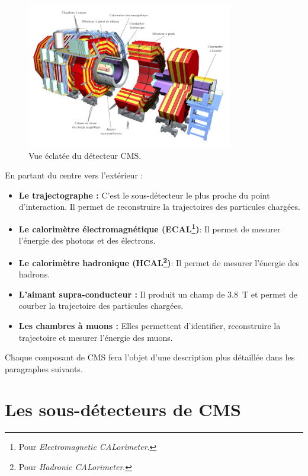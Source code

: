 \begin{figure}
	\centering
	\includegraphics[width=0.80\textwidth]{CMS/cms.png}
	\caption{\label{cmsexploded}Vue éclatée du détecteur CMS.}
\end{figure}
\newpage
En partant du centre vers l'extérieur :
\begin{itemize}[label=$\bullet$]
	\item \textbf{Le trajectographe : } C'est le sous-détecteur le plus proche du point d'interaction. Il permet de reconstruire la trajectoires des particules chargées.
	 \item \textbf{Le calorimètre électromagnétique (ECAL\footnote{Pour \textit{Electromagnetic CALorimeter}.})}: Il permet de mesurer l'énergie des photons et des électrons.
	 \item \textbf{Le calorimètre hadronique (HCAL\footnote{Pour \textit{Hadronic CALorimeter}.})}: Il permet de mesurer l'énergie des hadrons.
	 \item \textbf{L'aimant supra-conducteur : } Il produit un champ de \SI{3.8}{\tesla} et permet de courber la trajectoire des particules chargées.
	 \item \textbf{Les chambres à muons : } Elles permettent d'identifier, reconstruire la trajectoire et mesurer l'énergie des muons. 
\end{itemize}
Chaque composant de CMS fera l'objet d'une description plus détaillée dans les paragraphes suivants.

\section{Les sous-détecteurs de CMS}
